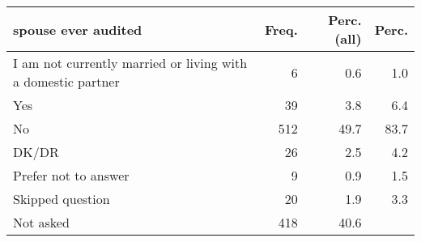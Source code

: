 \begin{table}[ht]
\centering
\begin{tabular}{lrrr}
  \hline
spouse ever audited & Freq. & Perc.(all) & Perc. \\ 
  \hline
I am not currently married or living with a domestic partner &  6 & 0.6 & 1.0 \\ 
  Yes & 39 & 3.8 & 6.4 \\ 
  No & 512 & 49.7 & 83.7 \\ 
  DK/DR & 26 & 2.5 & 4.2 \\ 
  Prefer not to answer &  9 & 0.9 & 1.5 \\ 
  Skipped question & 20 & 1.9 & 3.3 \\ 
  Not asked & 418 & 40.6 &  \\ 
   \hline
\end{tabular}
\end{table}
